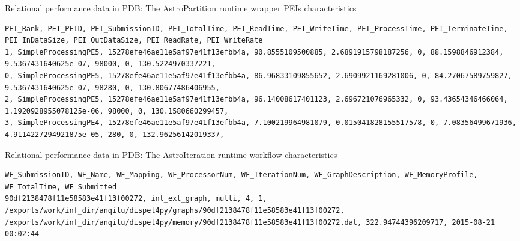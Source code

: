 \documentclass[10pt,twoside,openright,logo]{report}
\begin{document}
\begin{listing}
\caption{Relational performance data in PDB: The AstroPartition runtime wrapper PEIs characteristics}
\label{code:astrop-pei}
\begin{verbatim}
PEI_Rank, PEI_PEID, PEI_SubmissionID, PEI_TotalTime, PEI_ReadTime, PEI_WriteTime, PEI_ProcessTime, PEI_TerminateTime, PEI_InDataSize, PEI_OutDataSize, PEI_ReadRate, PEI_WriteRate
1, SimpleProcessingPE5, 15278efe46ae11e5af97e41f13efbb4a, 90.8555109500885, 2.6891915798187256, 0, 88.1598846912384, 9.5367431640625e-07, 98000, 0, 130.5224970337221,
0, SimpleProcessingPE5, 15278efe46ae11e5af97e41f13efbb4a, 86.96833109855652, 2.6909921169281006, 0, 84.27067589759827, 9.5367431640625e-07, 98280, 0, 130.80677486406955,
2, SimpleProcessingPE5, 15278efe46ae11e5af97e41f13efbb4a, 96.14008617401123, 2.696721076965332, 0, 93.43654346466064, 1.1920928955078125e-06, 98000, 0, 130.1580660299457,
3, SimpleProcessingPE4, 15278efe46ae11e5af97e41f13efbb4a, 7.100219964981079, 0.015041828155517578, 0, 7.08356499671936, 4.9114227294921875e-05, 280, 0, 132.96256142019337,
\end{verbatim}
\end{listing}


\begin{listing}
\caption{Relational performance data in PDB: The AstroIteration runtime workflow characteristics}
\label{code:astroi-wf}
\begin{verbatim}
WF_SubmissionID, WF_Name, WF_Mapping, WF_ProcessorNum, WF_IterationNum, WF_GraphDescription, WF_MemoryProfile, WF_TotalTime, WF_Submitted
90df2138478f11e58583e41f13f00272, int_ext_graph, multi, 4, 1, /exports/work/inf_dir/anqilu/dispel4py/graphs/90df2138478f11e58583e41f13f00272, /exports/work/inf_dir/anqilu/dispel4py/memory/90df2138478f11e58583e41f13f00272.dat, 322.94744396209717, 2015-08-21 00:02:44
\end{verbatim}
\end{listing}
\end{document}
